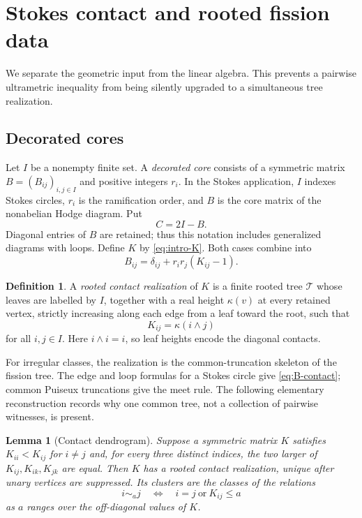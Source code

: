 \documentclass[11pt,a4paper]{amsart}
\theoremstyle{plain}
\newtheorem{lemma}[theorem]{Lemma}
\theoremstyle{definition}
\newtheorem{definition}[theorem]{Definition}
\newcommand{\Tcal}{\mathcal T}
\begin{document}
\fi

\section{Stokes contact and rooted fission data}\label{sec:geometry}

We separate the geometric input from the linear algebra.  This prevents a pairwise ultrametric
inequality from being silently upgraded to a simultaneous tree realization.

\subsection{Decorated cores}

Let $I$ be a nonempty finite set.  A \emph{decorated core} consists of a symmetric matrix
$B=(B_{ij})_{i,j\in I}$ and positive integers $r_i$.  In the Stokes application, $I$ indexes
Stokes circles, $r_i$ is the ramification order, and $B$ is the core matrix of the nonabelian
Hodge diagram.  Put
\begin{equation}\label{eq:Cartan-def}
                         C=2I-B.
\end{equation}
Diagonal entries of $B$ are retained; thus this notation includes generalized diagrams with
loops.  Define $K$ by \eqref{eq:intro-K}.  Both cases combine into
\begin{equation}\label{eq:B-contact}
            B_{ij}=\delta_{ij}+r_ir_j(K_{ij}-1).
\end{equation}

\begin{definition}\label{def:rooted-realization}
A \emph{rooted contact realization} of $K$ is a finite rooted tree $\Tcal$ whose leaves are
labelled by $I$, together with a real height $\kappa(v)$ at every retained vertex, strictly
increasing along each edge from a leaf toward the root, such that
\[
                         K_{ij}=\kappa(i\wedge j)
\]
for all $i,j\in I$.  Here $i\wedge i=i$, so leaf heights encode the diagonal contacts.
\end{definition}

For irregular classes, the realization is the common-truncation skeleton of the fission tree.
The edge and loop formulas for a Stokes circle give \eqref{eq:B-contact}; common Puiseux
truncations give the meet rule.  The following elementary reconstruction records why one common
tree, not a collection of pairwise witnesses, is present.

\begin{lemma}[Contact dendrogram]\label{lem:dendrogram}
Suppose a symmetric matrix $K$ satisfies $K_{ii}<K_{ij}$ for $i\ne j$ and, for every three
distinct indices, the two larger of $K_{ij},K_{ik},K_{jk}$ are equal.  Then $K$ has a rooted
contact realization, unique after unary vertices are suppressed.  Its clusters are the classes of
the relations
\[
 i\sim_a j\quad\Longleftrightarrow\quad i=j\ \text{or}\ K_{ij}\le a
\]
as $a$ ranges over the off-diagonal values of $K$.
\end{lemma}
\end{document}
